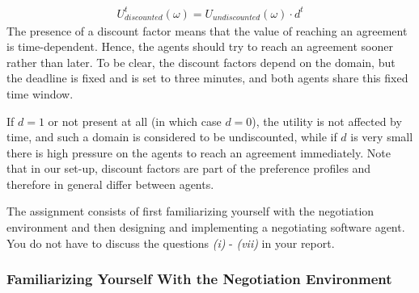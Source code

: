 \documentclass[a4paper]{article}
\begin{document}
\begin{eqnarray}
U_{discounted}^t(\omega) = U_{undiscounted}(\omega) \cdot d^t
\end{eqnarray}
The presence of a discount factor means that the value of reaching an agreement is time-dependent. Hence, the agents should try to reach an agreement sooner rather than later. To be clear, the discount factors depend on the domain, but the deadline is fixed and is set to three minutes, and both agents share this fixed time window. 

If $d = 1$ or not present at all (in which case $d=0$), the utility is not affected by time, and such a domain is considered to be undiscounted, while if $d$ is very small there is high pressure on the agents to reach an agreement immediately. Note that in our set-up, discount factors are part of the preference profiles and therefore in general differ between agents.

The assignment consists of first familiarizing yourself with the negotiation environment and then designing and implementing a negotiating software agent. You do not have to discuss the questions \emph{(i)} - \emph{(vii)} in your report.

\subsubsection{Familiarizing Yourself With the Negotiation Environment}
\end{document}
